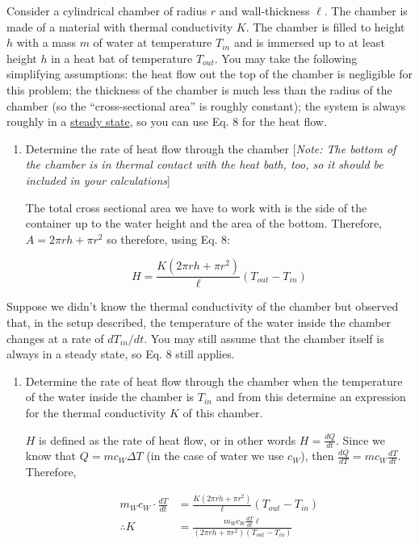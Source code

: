 \documentclass[10pt]{article}
\begin{document}
    Consider a cylindrical chamber of radius $r$ and wall-thickness $\ell$. The chamber is made of a material with thermal conductivity $K$. The chamber is filled to height $h$ with a mass $m$ of water at temperature $T_{in}$ and is immersed up to at least height $h$ in a heat bat of temperature $T_{out}$. You may take the following simplifying assumptions: the heat flow out the top of the chamber is negligible for this problem; the thickness of the chamber is much less than the radius of the chamber (so the ``cross-sectional area'' is roughly constant); the system is always roughly in a \underline{steady state}, so you can use Eq. 8 for the heat flow. 

    \begin{enumerate}[start, label= \alph*)]
        \item Determine the rate of heat flow through the chamber [\textit{Note: The bottom of the chamber is in thermal contact with the heat bath, too, so it should be included in your calculations}]
        
        \begin{solution}
            The total cross sectional area we have to work with is the side of the container up to the water height and the area of the bottom. Therefore, $A = 2\pi r h + \pi r^2$ so therefore, using Eq. 8: 

            \[ H = \frac{K(2\pi rh + \pi r^2)}{\ell}(T_{out} -T_{in})\]
        \end{solution}
    \end{enumerate}

    Suppose we didn't know the thermal conductivity of the chamber but observed that, in the setup described, the temperature of the water inside the chamber changes at a rate of $dT_{in}/dt$. You may still assume that the chamber itself is always in a steady state, so Eq. 8 still applies. 

    \begin{enumerate}[resume, label=\alph*)]
        \item Determine the rate of heat flow through the chamber when the temperature of the water inside the chamber is $T_{in}$ and from this determine an expression for the thermal conductivity $K$ of this chamber.
        
        \begin{solution}
            $H$ is defined as the rate of heat flow, or in other words $H = \frac{dQ}{dt}$. Since we know that $Q = mc_W\Delta T$ (in the case of water we use $c_W$), then $\frac{dQ}{dT} = mc_W \frac{dT}{dt}$. Therefore, 

            \begin{align*}
                m_Wc_W \cdot \frac{dT}{dt} &= \frac{K(2\pi r h + \pi r^2)}{\ell }(T_{out} - T_{in})\\
                \therefore K &= \frac{m_Wc_W \frac{dT}{dt} \ell}{(2 \pi r h + \pi r^2)(T_{out} - T_{in})}
            \end{align*}
        \end{solution}
    \end{enumerate}
\end{document}
